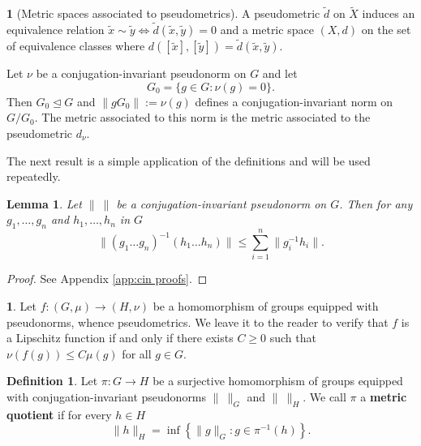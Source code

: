 \documentclass[12pt]{amsart}
\newtheorem{lemma}[prop]{Lemma}
\theoremstyle{definition}
\newtheorem{defn}[prop]{Definition}
\newtheorem{void}[prop]{}
\def\nsg{\trianglelefteq}
\begin{document}
\begin{void}[Metric spaces associated to pseudometrics]\label{V:pseudometric to metric}
A pseudometric $\tilde{d}$ on  $\tilde{X}$ induces an equivalence relation $\tilde{x} \sim \tilde{y} \iff \tilde{d}(\tilde{x},\tilde{y})=0$ and a metric space $(X,d)$ on the set of equivalence classes where $d([\tilde{x}],[\tilde{y}])=\tilde{d}(\tilde{x},\tilde{y})$.

Let $\nu$ be a conjugation-invariant pseudonorm on $G$ and let
\[
G_0 = \{ g \in G : \nu(g)=0\}.
\]
Then $G_0 \nsg G$  and $\|gG_0\|:=\nu(g)$ defines a conjugation-invariant norm on $G/G_0$. 
The metric associated to this norm is the metric associated to the pseudometric $d_{\nu}$.
\end{void}

The next result is a simple application of the definitions and will be used repeatedly.




\begin{lemma}
\label{L:conj invariant consequences}
Let $\| \ \|$ be a conjugation-invariant pseudonorm on $G$.
Then for any $g_1,\dots,g_n$ and $h_1,\dots,h_n$ in $G$
\[
\| (g_1\dots g_n)^{-1} (h_1\dots h_n)\| \leq \sum_{i=1}^n \|g_i^{-1} h_i\|.
\]
\end{lemma}


\begin{proof}
See Appendix \ref{app:cin proofs}.

\end{proof}





\begin{void}
Let $f \colon (G,\mu) \to (H,\nu)$ be a homomorphism of groups equipped with pseudonorms, whence pseudometrics.
We leave it to the reader to verify that $f$ is a Lipschitz function if and only if there exists $C \geq 0$ such that $\nu(f(g)) \leq C \mu(g)$ for all $g \in G$.
\end{void}





\begin{defn}\label{VD:metric quotient}
Let  $\pi \colon G \to H$ be a surjective homomorphism of groups equipped with conjugation-invariant pseudonorms $\| \ \|_G$ and $\| \ \|_H$. 
We call $\pi$ a {\bf metric quotient} if for every $h \in H$
\begin{equation}\label{eqn:metric quotient condition}
\| h\|_H = \inf \left\{ \|g\|_G : g \in \pi^{-1}(h)\right\}.
\end{equation}
\end{defn}
\end{document}
